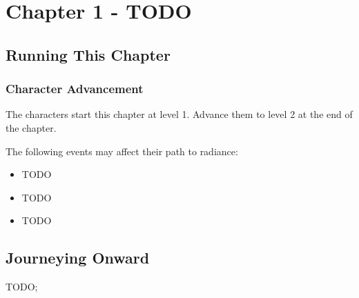 \chapter{Chapter 1 - TODO}
\label{chap:chapter1}

\setcounter{section}{-1}
\section{Running This Chapter}

\lipsum[1][1]

\lipsum[1][2]

\subsection{Character Advancement}

The characters start this chapter at level 1. Advance them to level 2 at the end of the chapter.

The following events may affect their path to radiance:
\begin{itemize}
	\item TODO
	\item TODO
	\item TODO
\end{itemize}






\section{Journeying Onward}

TODO; \lipsum[1][1]


